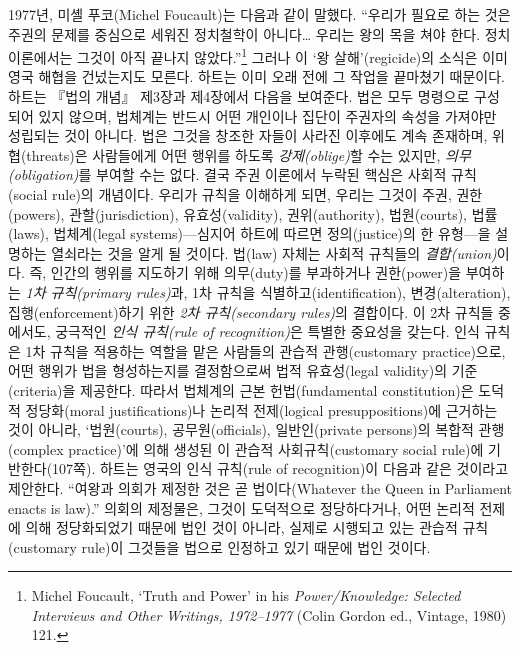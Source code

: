 \documentclass[12pt, oneside]{book}  %
\begin{document}
1977년, 미셸 푸코(Michel Foucault)는 다음과 같이 말했다. ``우리가 필요로
하는 것은 주권의 문제를 중심으로 세워진 정치철학이 아니다\ldots{} 우리는
왕의 목을 쳐야 한다. 정치이론에서는 그것이 아직 끝나지
않았다.''\footnote{Michel Foucault, `Truth and Power' in his
  \emph{Power/Knowledge: Selected Interviews and Other Writings,
  1972--1977} (Colin Gordon ed., Vintage, 1980) 121.} 그러나 이 `왕
살해'(regicide)의 소식은 이미 영국 해협을 건넜는지도 모른다. 하트는 이미
오래 전에 그 작업을 끝마쳤기 때문이다. 하트는 『법의 개념』 제3장과
제4장에서 다음을 보여준다. 법은 모두 명령으로 구성되어 있지 않으며,
법체계는 반드시 어떤 개인이나 집단이 주권자의 속성을 가져야만 성립되는
것이 아니다. 법은 그것을 창조한 자들이 사라진 이후에도 계속 존재하며,
위협(threats)은 사람들에게 어떤 행위를 하도록 \emph{강제(oblige)}할 수는
있지만, \emph{의무(obligation)}를 부여할 수는 없다. 결국 주권 이론에서
누락된 핵심은 사회적 규칙(social rule)의 개념이다. 우리가 규칙을
이해하게 되면, 우리는 그것이 주권, 권한(powers), 관할(jurisdiction),
유효성(validity), 권위(authority), 법원(courts), 법률(laws),
법체계(legal systems)---심지어 하트에 따르면 정의(justice)의 한
유형---을 설명하는 열쇠라는 것을 알게 될 것이다. 법(law) 자체는 사회적
규칙들의 \emph{결합(union)}이다. 즉, 인간의 행위를 지도하기 위해
의무(duty)를 부과하거나 권한(power)을 부여하는 \emph{1차 규칙(primary
rules)}과, 1차 규칙을 식별하고(identification), 변경(alteration),
집행(enforcement)하기 위한 \emph{2차 규칙(secondary rules)}의 결합이다.
이 2차 규칙들 중에서도, 궁극적인 \emph{인식 규칙(rule of recognition)}은
특별한 중요성을 갖는다. 인식 규칙은 1차 규칙을 적용하는 역할을 맡은
사람들의 관습적 관행(customary practice)으로, 어떤 행위가 법을
형성하는지를 결정함으로써 법적 유효성(legal validity)의 기준(criteria)을
제공한다. 따라서 법체계의 근본 헌법(fundamental constitution)은 도덕적
정당화(moral justifications)나 논리적 전제(logical presuppositions)에
근거하는 것이 아니라, `법원(courts), 공무원(officials), 일반인(private
persons)의 복합적 관행(complex practice)'에 의해 생성된 이 관습적
사회규칙(customary social rule)에 기반한다(107쪽). 하트는 영국의 인식
규칙(rule of recognition)이 다음과 같은 것이라고 제안한다. ``여왕과
의회가 제정한 것은 곧 법이다(Whatever the Queen in Parliament enacts is
law).'' 의회의 제정물은, 그것이 도덕적으로 정당하다거나, 어떤 논리적
전제에 의해 정당화되었기 때문에 법인 것이 아니라, 실제로 시행되고 있는
관습적 규칙(customary rule)이 그것들을 법으로 인정하고 있기 때문에 법인
것이다.
\end{document}

